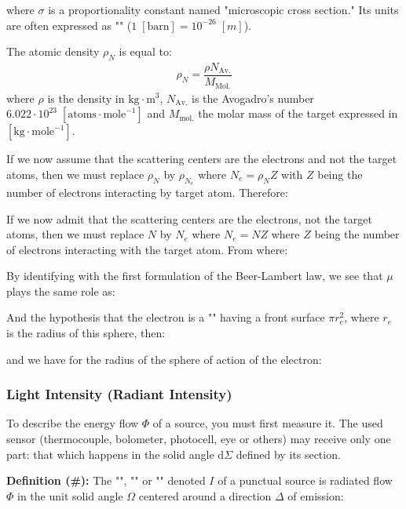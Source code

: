 	where $\sigma$ is a proportionality constant named "microscopic cross section." Its units are often expressed as "" ($1\;[\text{barn}]=10^{-26}\;[m]$).
	\begin{tcolorbox}[title=Remark,colframe=black,arc=10pt]
	The atomic density $\rho_N$ is equal to:
	\begin{gather*}
		\rho_N=\dfrac{\rho N_\text{Av.}}{M_\text{Mol.}}
	 \end{gather*}
	where  $\rho$ is the density in $\text{kg}\cdot\text{m}^3$, $N_\text{Av.}$ is the Avogadro's number $6.022\cdot 10^{23}\; [\text{atoms}\cdot \text{mole}^{-1}]$ and $M_\text{mol.}$ the molar mass of the target expressed in $[\text{kg}\cdot \text{mole}^{-1}]$.
	\end{tcolorbox}
	If we now assume that the scattering centers are the electrons and not the target atoms, then we must replace $\rho_N$ by $\rho_{N_e}$ where $N_e=\rho_NZ$ with $Z$ being the number of electrons interacting by target atom. Therefore:
	
	If we now admit that the scattering centers are the electrons, not the target atoms, then we must replace $N$ by $N_e$ where $N_e=NZ$ where $Z$  being the number of electrons interacting with the target atom. From where:
	
	By identifying with the first formulation of the Beer-Lambert law, we see that $\mu$ plays the same role as:
	
	And the hypothesis that the electron is a "" having a front surface $\pi r_e^2$, where $r_e$ is the radius of this sphere, then:
	
	and we have for the radius of the sphere of action of the electron:
	
	
	\subsubsection{Light Intensity (Radiant Intensity)}\label{solid angle optics}
	To describe the energy flow $\Phi$ of a source, you must first measure it. The used sensor (thermocouple, bolometer, photocell, eye or others) may receive only one part: that which happens in the solid angle  $\mathrm{d}\Sigma$ defined by its section.

	 \textbf{Definition (\#\mydef):} The "", "" or "" denoted $I$ of a punctual source is radiated flow $\Phi$ in the unit solid angle $\Omega$ centered around a direction $\Delta$ of emission:
	
